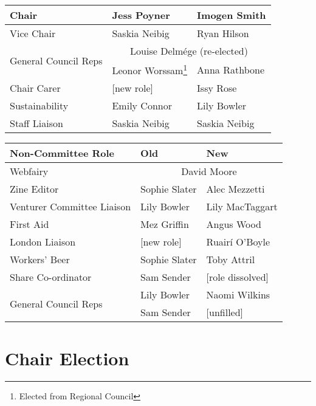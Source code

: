 \documentclass[a4paper, 11pt]{article} %
\begin{document}
\begin{savenotes}
\begin{center}
\begin{tabular}{ l  l  l }
	Chair					& Jess Poyner 			& Imogen Smith \\ \hline
	Vice Chair				& Saskia Neibig 		& Ryan Hilson \\ \hline
	\multirow{2}{*}{General Council Reps}	& \multicolumn{2}{c}{Louise Delmége (re-elected)} \\ \cline{2-3}
							& Leonor Worssam\footnote{Elected from Regional Council}	& Anna Rathbone \\ \hline
	Chair Carer				& [new role]			& Issy Rose \\ \hline
	Sustainability				& Emily Connor 		& Lily Bowler \\ \hline
	Staff Liaison				& Saskia Neibig 		& Saskia Neibig \\ \hline \hline
	\end{tabular}
\end{center}
\end{savenotes}

\begin{savenotes}
\begin{center}
	\begin{tabular}{ l l l } \hline \hline
	\textbf{Non-Committee Role}		& \textbf{Old}			& \textbf{New} \\ \hline
	Webfairy						& \multicolumn{2}{c}{David Moore} \\ \hline
	Zine Editor					& Sophie Slater		& Alec Mezzetti \\ \hline
	Venturer Committee Liaison		& Lily Bowler			& Lily MacTaggart \\ \hline
	First Aid						& Mez Griffin			& Angus Wood \\ \hline
	London Liaison					& [new role]			& Ruairí O'Boyle \\ \hline
	Workers' Beer					& Sophie Slater		& Toby Attril \\ \hline
	Share Co-ordinator				& Sam Sender			& [role dissolved] \\ \hline
	\multirow{2}{*}{General Council Reps}		& Lily Bowler	& Naomi Wilkins \\ \cline{2-3}
								& Sam Sender			& [unfilled] \\ \hline \hline
	\end{tabular}
\end{center}
\end{savenotes}

\section{Chair Election}
\end{document}
